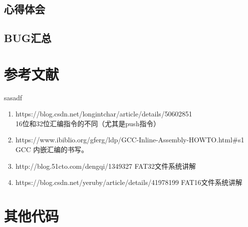 \documentclass[a4paper]{article}
\begin{document}
    \subsection{心得体会}
 
    \subsection{BUG汇总}
\begin{appendices}
\section{参考文献} \label{sec:reference}
sasadf
\begin{enumerate}
    \item https://blog.csdn.net/longintchar/article/details/50602851 \\
    16位和32位汇编指令的不同（尤其是push指令）
    \item https://www.ibiblio.org/gferg/ldp/GCC-Inline-Assembly-HOWTO.html\#s1 \\
    GCC 内嵌汇编的书写。
    \item http://blog.51cto.com/dengqi/1349327
    FAT32文件系统讲解
    \item https://blog.csdn.net/yeruby/article/details/41978199
    FAT16文件系统讲解
  \end{enumerate}
\section{其他代码} \label{sec:otherCode}
\end{appendices}
\end{document}
